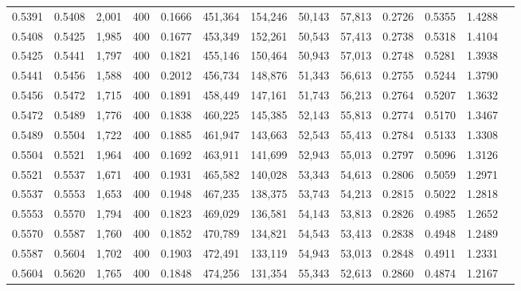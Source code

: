 \begin{tabular}{rrrrrrrrrrrrr}
0.5391 & 0.5408 &  2,001 & 400 &                                     0.1666 & 451,364 & 154,246 &  50,143 &  57,813 & 0.2726 & 0.5355 & 1.4288 \\
0.5408 & 0.5425 &  1,985 & 400 &                                     0.1677 & 453,349 & 152,261 &  50,543 &  57,413 & 0.2738 & 0.5318 & 1.4104 \\
0.5425 & 0.5441 &  1,797 & 400 &                                     0.1821 & 455,146 & 150,464 &  50,943 &  57,013 & 0.2748 & 0.5281 & 1.3938 \\
0.5441 & 0.5456 &  1,588 & 400 &                                     0.2012 & 456,734 & 148,876 &  51,343 &  56,613 & 0.2755 & 0.5244 & 1.3790 \\
0.5456 & 0.5472 &  1,715 & 400 &                                     0.1891 & 458,449 & 147,161 &  51,743 &  56,213 & 0.2764 & 0.5207 & 1.3632 \\
0.5472 & 0.5489 &  1,776 & 400 &                                     0.1838 & 460,225 & 145,385 &  52,143 &  55,813 & 0.2774 & 0.5170 & 1.3467 \\
0.5489 & 0.5504 &  1,722 & 400 &                                     0.1885 & 461,947 & 143,663 &  52,543 &  55,413 & 0.2784 & 0.5133 & 1.3308 \\
0.5504 & 0.5521 &  1,964 & 400 &                                     0.1692 & 463,911 & 141,699 &  52,943 &  55,013 & 0.2797 & 0.5096 & 1.3126 \\
0.5521 & 0.5537 &  1,671 & 400 &                                     0.1931 & 465,582 & 140,028 &  53,343 &  54,613 & 0.2806 & 0.5059 & 1.2971 \\
0.5537 & 0.5553 &  1,653 & 400 &                                     0.1948 & 467,235 & 138,375 &  53,743 &  54,213 & 0.2815 & 0.5022 & 1.2818 \\
0.5553 & 0.5570 &  1,794 & 400 &                                     0.1823 & 469,029 & 136,581 &  54,143 &  53,813 & 0.2826 & 0.4985 & 1.2652 \\
0.5570 & 0.5587 &  1,760 & 400 &                                     0.1852 & 470,789 & 134,821 &  54,543 &  53,413 & 0.2838 & 0.4948 & 1.2489 \\
0.5587 & 0.5604 &  1,702 & 400 &                                     0.1903 & 472,491 & 133,119 &  54,943 &  53,013 & 0.2848 & 0.4911 & 1.2331 \\
0.5604 & 0.5620 &  1,765 & 400 &                                     0.1848 & 474,256 & 131,354 &  55,343 &  52,613 & 0.2860 & 0.4874 & 1.2167 \\

\end{tabular}
